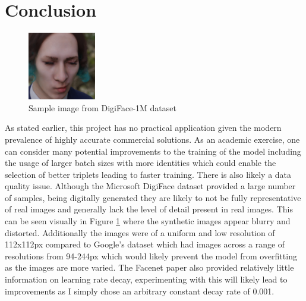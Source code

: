 \documentclass[10pt,twocolumn,letterpaper]{article}
\begin{document}
\section{Conclusion}
\begin{figure}[t]
   \begin{center}
      \includegraphics[width=0.8\linewidth]{14.png}
   \end{center}
      \caption{Sample image from DigiFace-1M dataset }
   \label{fig:face}
\end{figure}
As stated earlier, this project has no practical application given the modern prevalence of highly accurate commercial solutions.
As an academic exercise, one can consider many potential improvements to the training of the model including the usage of larger batch sizes with more identities which could enable the selection of better triplets leading to faster training.
There is also likely a data quality issue.
Although the Microsoft DigiFace dataset provided a large number of samples, being digitally generated they are likely to not be fully representative of real images and generally lack the level of detail present in real images.
This can be seen visually in Figure \ref{fig:face} where the synthetic images appear blurry and distorted.
Additionally the images were of a uniform and low resolution of 112x112px compared to Google's dataset which had images across a range of resolutions from 94-244px which would likely prevent the model from overfitting as the images are more varied.
The Facenet paper also provided relatively little information on learning rate decay, experimenting with this will likely lead to improvements as I simply chose an arbitrary constant decay rate of 0.001.\\
\end{document}
